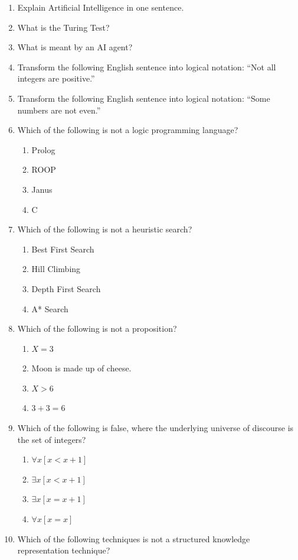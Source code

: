 \documentclass[11pt,a4paper]{article}
\begin{document}
\begin{enumerate}[label=(\roman*),leftmargin=*,itemsep=8pt]
  \item Explain Artificial Intelligence in one sentence.
  \item What is the Turing Test?
  \item What is meant by an AI agent?
  \item Transform the following English sentence into logical notation: ``Not all integers are positive.''
  \item Transform the following English sentence into logical notation: ``Some numbers are not even.''
  \item Which of the following is not a logic programming language?
  
\begin{enumerate}[label=(\alph*),itemsep=2pt]
    \item Prolog
    \item ROOP
    \item Janus
    \item C
  \end{enumerate}
  \item Which of the following is not a heuristic search?
  
\begin{enumerate}[label=(\alph*),itemsep=2pt]
    \item Best First Search
    \item Hill Climbing
    \item Depth First Search
    \item A* Search
  \end{enumerate}
  \item Which of the following is not a proposition?
  
\begin{enumerate}[label=(\alph*),itemsep=2pt]
    \item $X = 3$
    \item Moon is made up of cheese.
    \item $X > 6$
    \item $3 + 3 = 6$
  \end{enumerate}
  \item Which of the following is false, where the underlying universe of discourse is the set of integers?
  
\begin{enumerate}[label=(\alph*),itemsep=2pt]
    \item $\forall x [x < x+1]$
    \item $\exists x [x < x+1]$
    \item $\exists x [x = x+1]$
    \item $\forall x [x = x]$
  \end{enumerate}
  \item Which of the following techniques is not a structured knowledge representation technique?
  

\end{enumerate}
\end{document}
